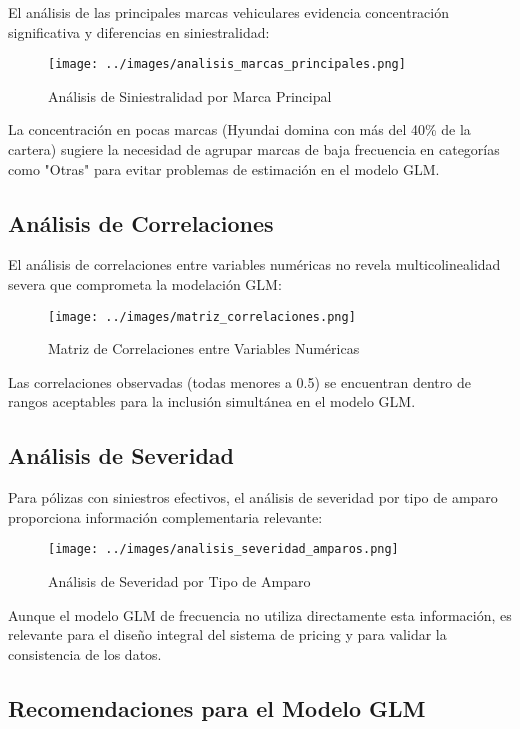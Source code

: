 El análisis de las principales marcas vehiculares evidencia concentración significativa y diferencias en siniestralidad:

\begin{figure}[H]
\centering
\texttt{[image: ../images/analisis\_marcas\_principales.png]}
\caption{Análisis de Siniestralidad por Marca Principal}
\end{figure}

La concentración en pocas marcas (Hyundai domina con más del 40\% de la cartera) sugiere la necesidad de agrupar marcas de baja frecuencia en categorías como "Otras" para evitar problemas de estimación en el modelo GLM.

\subsection{Análisis de Correlaciones}

El análisis de correlaciones entre variables numéricas no revela multicolinealidad severa que comprometa la modelación GLM:

\begin{figure}[H]
\centering
\texttt{[image: ../images/matriz\_correlaciones.png]}
\caption{Matriz de Correlaciones entre Variables Numéricas}
\end{figure}

Las correlaciones observadas (todas menores a 0.5) se encuentran dentro de rangos aceptables para la inclusión simultánea en el modelo GLM.

\subsection{Análisis de Severidad}

Para pólizas con siniestros efectivos, el análisis de severidad por tipo de amparo proporciona información complementaria relevante:

\begin{figure}[H]
\centering
\texttt{[image: ../images/analisis\_severidad\_amparos.png]}
\caption{Análisis de Severidad por Tipo de Amparo}
\end{figure}

Aunque el modelo GLM de frecuencia no utiliza directamente esta información, es relevante para el diseño integral del sistema de pricing y para validar la consistencia de los datos.

\subsection{Recomendaciones para el Modelo GLM}

